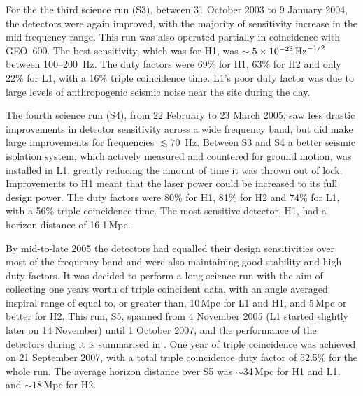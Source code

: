 \documentclass{article}
\begin{document}
For the the third science run (S3), between 31 October 2003 to 9 January 2004,
the detectors were again improved, with the majority of sensitivity increase in
the mid-frequency range. This run was also operated partially in coincidence
with GEO~600. The best sensitivity, which was for H1, was
$\sim5\times10^{-23}\,{\rm Hz}^{-1/2}$ between 100--200~Hz. The duty factors
were 69\% for H1, 63\% for H2 and only 22\% for L1, with a 16\% triple
coincidence time. L1's poor duty factor was due to large levels of anthropogenic
seismic noise near the site during the day.

The fourth science run (S4), from 22 February to 23 March 2005, saw less drastic
improvements in detector sensitivity across a wide frequency band, but did make
large improvements for frequencies $\lesssim 70$~Hz. Between S3 and S4 a better
seismic isolation system, which actively measured and countered for ground
motion, was installed in L1, greatly reducing the amount of time
it was thrown out of lock. Improvements to H1 meant that the laser power
could be increased to its full design power. The duty factors were 80\% for H1,
81\% for H2 and 74\% for L1, with a 56\% triple coincidence time. The most
sensitive detector, H1, had a horizon distance of 16.1\,Mpc.

By mid-to-late 2005 the detectors had equalled their design sensitivities over
most of the frequency band and were also maintaining good stability and high
duty factors. It was decided to perform a long science run with the aim of
collecting one years worth of triple coincident data, with an angle averaged
inspiral range of equal to, or greater than, 10\,Mpc for L1 and H1, and 5\,Mpc
or better for H2. This run, S5, spanned from 4 November 2005 (L1 started
slightly later on 14 November) until 1 October 2007, and the performance of the
detectors during it is summarised in \cite{LIGOS5}. One year of triple
coincidence was achieved on 21 September 2007, with a total triple coincidence
duty factor of 52.5\% for the whole run. The average horizon distance over S5
was $\sim$34\,Mpc for H1 and L1, and $\sim18$\,Mpc for H2.
\end{document}
